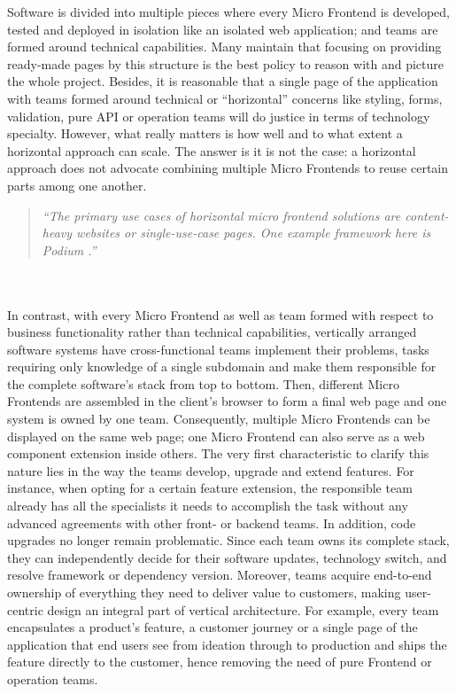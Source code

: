 \documentclass[a4paper]{book}
\begin{document}
Software is divided into multiple pieces where every Micro Frontend is developed, tested and deployed in isolation like an isolated web application; and teams are formed around technical capabilities. Many maintain that focusing on providing ready-made pages by this structure is the best policy to reason with and picture the whole project. Besides, it is reasonable that a single page of the application with teams formed around technical or “horizontal” concerns like styling, forms, validation, pure API or operation teams will do justice in terms of technology specialty. However, what really matters is how well and to what extent a horizontal approach can scale. The answer is it is not the case: a horizontal approach does not advocate combining multiple Micro Frontends to reuse certain parts among one another. \cite{Rap20}
\begin{quote}
    \textit{“The primary use cases of horizontal micro frontend solutions are content-heavy websites or single-use-case pages. One example framework here is Podium \cite{Podium}.”} \cite{Rap20}
\end{quote}
\\ 
\\
In contrast, with every Micro Frontend as well as team formed with respect to business functionality rather than technical capabilities, vertically arranged software systems have cross-functional teams implement their problems, tasks requiring only knowledge of a single subdomain and make them responsible for the complete software’s stack from top to bottom. Then, different Micro Frontends are assembled in the client’s browser to form a final web page and one system is owned by one team. Consequently, multiple Micro Frontends can be displayed on the same web page; one Micro Frontend can also serve as a web component extension inside others. The very first characteristic to clarify this nature lies in the way the teams develop, upgrade and extend features. For instance, when opting for a certain feature extension, the responsible team already has all the specialists it needs to accomplish the task without any advanced agreements with other front- or backend teams. In addition, code upgrades no longer remain problematic. Since each team owns its complete stack, they can independently decide for their software updates, technology switch, and resolve framework or dependency version. Moreover, teams acquire end-to-end ownership of everything they need to deliver value to customers, making user-centric design an integral part of vertical architecture. For example, every team encapsulates a product's feature, a customer journey or a single page of the application that end users see from ideation through to production and ships the feature directly to the customer, hence removing the need of pure Frontend or operation teams. \cite{Gee20}
\end{document}
